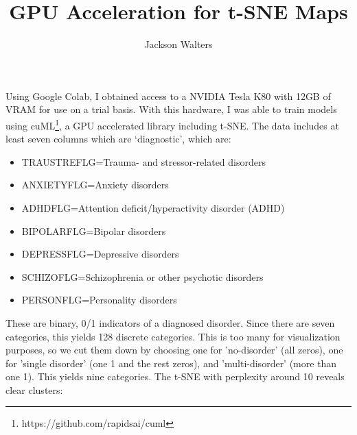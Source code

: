 \documentclass[11pt]{amsart}
\title{GPU Acceleration for t-SNE Maps}
\author{Jackson Walters}
\begin{document}
\maketitle

Using Google Colab, I obtained access to a NVIDIA Tesla K80 with 12GB of VRAM for use on a trial basis. With this hardware, I was able to train models using cuML\footnote{https://github.com/rapidsai/cuml}, a GPU accelerated library including t-SNE. The data includes at least seven columns which are `diagnostic', which are: \\

\begin{itemize}
  \item TRAUSTREFLG=Trauma- and stressor-related disorders
  \item ANXIETYFLG=Anxiety disorders
  \item ADHDFLG=Attention deficit/hyperactivity disorder (ADHD)
  \item BIPOLARFLG=Bipolar disorders
  \item DEPRESSFLG=Depressive disorders
  \item SCHIZOFLG=Schizophrenia or other psychotic disorders
  \item PERSONFLG=Personality disorders
\end{itemize}

\vspace{5mm}

These are binary, 0/1 indicators of a diagnosed disorder. Since there are seven categories, this yields 128 discrete categories. This is too many for visualization purposes, so we cut them down by choosing one for 'no-disorder' (all zeros), one for 'single disorder' (one 1 and the rest zeros), and 'multi-disorder' (more than one 1). This yields nine categories. The t-SNE with perplexity around 10 reveals clear clusters:
\end{document}

